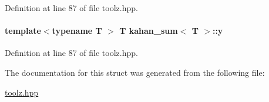 \-Definition at line 87 of file toolz.\-hpp.

\hypertarget{structkahan__sum_a68f0ab79ede9b3e1e6d08279ef5b0086}{
\paragraph[{y}]{\setlength{\rightskip}{0pt plus 5cm}template$<$typename T $>$ \-T {\bf kahan\-\_\-sum}$<$ \-T $>$\-::{\bf y}}}\label{structkahan__sum_a68f0ab79ede9b3e1e6d08279ef5b0086}


\-Definition at line 87 of file toolz.\-hpp.



\-The documentation for this struct was generated from the following file\-:\begin{DoxyCompactItemize}
\item 
\hyperlink{toolz_8hpp}{toolz.\-hpp}\end{DoxyCompactItemize}
